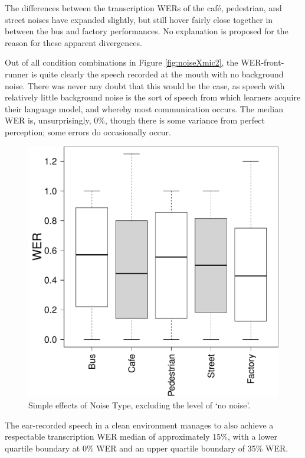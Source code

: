 \documentclass[dissertation,copyright]{uathesis}
\makeatletter
\def\maxwidth{ %
  \ifdim\Gin@nat@width>\linewidth
    \linewidth
  \else
    \Gin@nat@width
  \fi
}
\makeatother
\begin{document}
The differences between the transcription WERs of the caf\'{e}, pedestrian, and street noises have expanded slightly, but still hover fairly close together in between the bus and factory performances. No explanation is proposed for the reason for these apparent divergences.

Out of all condition combinations in Figure \ref{fig:noiseXmic2}, the WER-front-runner is quite clearly the speech recorded at the mouth with no background noise.  There was never any doubt that this would be the case, as speech with relatively little background noise is the sort of speech from which learners acquire their language model, and whereby most communication occurs.  The median WER is, unsurprisingly, 0\%, though there is some variance from perfect perception; some errors do occasionally occur. 
%
\begin{figure}

\includegraphics[width=\maxwidth]{figure/Noise-type_simple-1} 

\caption{Simple effects of Noise Type, excluding the level of `no noise'.}
\label{fig:noise-type_non-no-noise_main}
\end{figure}
%
The ear-recorded speech in a clean environment manages to also achieve a respectable transcription WER median of approximately 15\%, with a lower quartile boundary at 0\% WER and an upper quartile boundary of 35\% WER.
\end{document}

